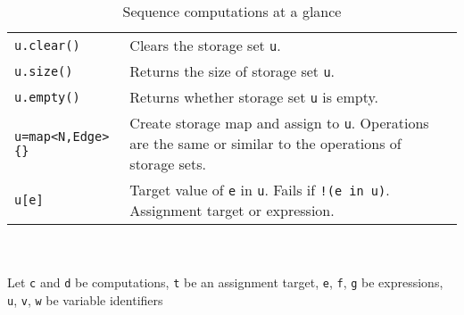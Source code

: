 \begin{table}[htbp]
\begin{minipage}{\linewidth}
\begin{tabularx}{\linewidth}{|lX|}
\texttt{u.clear()}	& Clears the storage set \texttt{u}.\\
\texttt{u.size()}	& Returns the size of storage set \texttt{u}.\\
\texttt{u.empty()} & Returns whether storage set \texttt{u} is empty.\\
\texttt{u=map<N,Edge>\{\}}	& Create storage map and assign to \texttt{u}. Operations are the same or similar to the operations of storage sets.\\
\texttt{u[e]}	& Target value of \texttt{e} in \texttt{u}. Fails if \texttt{!(e in u)}. Assignment target or expression.\\
\hline
\end{tabularx}
\end{minipage}\\
\\ 
{\small Let \texttt{c} and \texttt{d} be computations, \texttt{t} be an assignment target, \texttt{e}, \texttt{f}, \texttt{g} be expressions, \texttt{u}, \texttt{v}, \texttt{w} be variable identifiers }
\caption{Sequence computations at a glance}
\label{comptab}
\end{table}
 
